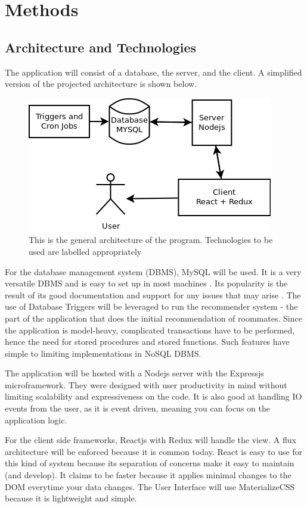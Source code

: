 \documentclass[journal]{./IEEE/IEEEtran}
\begin{document}
\section{Methods}

\subsection{Architecture and Technologies}
The application will consist of a database, the server, and the client. A simplified version of the projected architecture is shown below.
\\
\begin{figure}[h]
\centering
\includegraphics[scale=0.5]{Architecture}
\caption{This is the general architecture of the program. Technologies to be used are labelled appropriately}
\end{figure}

For the database management system (DBMS), MySQL will be used. It is a very versatile DBMS and is easy to set up in most
machines \cite{mysqlpage}. Its popularity is the result of its good documentation and support for any issues that may
arise \cite{mysqlpage}. The use of Database Triggers will be leveraged to run the recommender system - the part of the
application that does the initial recommendation of roommates. Since the application is model-heavy, complicated
transactions have to be performed, hence the need for stored procedures and stored functions. Such features have simple
to limiting implementations in NoSQL DBMS.

The application will be hosted with a Nodejs server with the Expressjs microframework. They were designed with user
productivity in mind without limiting scalability and expressiveness on the code. It is also good at handling IO events
from the user, as it is event driven, meaning you can focus on the application logic.

For the client side frameworks, Reactjs with Redux will handle the view. A flux architecture will be enforced because it
is common today. React is easy to use for this kind of system because its separation of concerns make it easy to
maintain (and develop). It claims to be faster because it applies minimal changes to the DOM everytime your data
changes. The User Interface will use MaterializeCSS because it is lightweight and simple.
\end{document}
